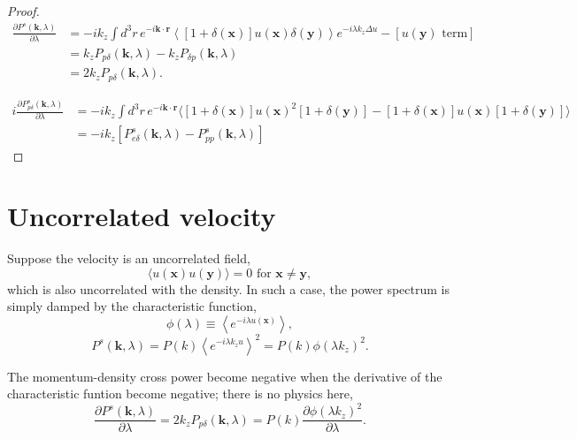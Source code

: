 \documentclass[a4paper,11pt, fleqn]{article}
\begin{document}
\begin{proof}
\begin{equation}\begin{split}
  \frac{\partial P^s(\bm{k}, \lambda)}{\partial \lambda}
  &= -ik_z \int \! d^3r \, e^{-i\bm{k}\cdot\bm{r}} \left\langle
       [1 + \delta(\bm{x})] u(\bm{x}) \delta(\bm{y}) \right\rangle
       e^{-i\lambda k_z \Delta u}
       - [u(\bm{y}) \mbox{ term}]\\
  &= k_z P_{p\delta}(\bm{k}, \lambda) - k_z P_{\delta p}(\bm{k}, \lambda)\\
  &= 2k_z P_{p\delta}(\bm{k}, \lambda).
\end{split}\end{equation}

\begin{equation}\begin{split}
  i \frac{\partial P_{p\delta}^s(\bm{k}, \lambda)}{\partial \lambda}
  &= -ik_z \int\! d^3 r \, e^{-i\bm{k}\cdot\bm{r}} \Big\langle
  [1 + \delta(\bm{x})]u(\bm{x})^2 [ 1 + \delta(\bm{y}) ]
  - [1 + \delta(\bm{x})]u(\bm{x}) [ 1 + \delta(\bm{y}) ]
  \Big\rangle\\
  &= -ik_z \left[ P^s_{e\delta}(\bm{k}, \lambda) - P^s_{pp}(\bm{k}, \lambda)
    \right]
\end{split}\end{equation}
\end{proof}

\clearpage
%
%
\section{Uncorrelated velocity}

Suppose the velocity is an uncorrelated field,
\begin{equation}
  \langle u(\bm{x}) u(\bm{y}) \rangle = 0 \mbox{ for $\bm{x} \neq \bm{y}$},
\end{equation}
which is also uncorrelated with the density.
In such a case, the power spectrum is simply damped by the
characteristic function,
%
\begin{equation}
  \phi(\lambda) \equiv \left\langle e^{-i\lambda u(\bm{x})}\right\rangle,
\end{equation}
%
\begin{equation}
  P^s(\bm{k}, \lambda) = P(k) \left\langle e^{-i\lambda k_z u} \right\rangle^2
  = P(k) \phi(\lambda k_z)^2.
\end{equation}

The momentum-density cross power become negative when the derivative
of the characteristic funtion become negative; there is no physics
here,
\begin{equation}
  \frac{\partial P^s(\bm{k}, \lambda)}{\partial \lambda}
  = 2k_z P_{p\delta}(\bm{k}, \lambda)
  = P(k) \frac{\partial \phi(\lambda k_z)^2}{\partial \lambda}.
\end{equation}
\end{document}
